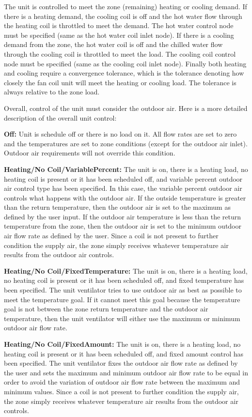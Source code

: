 The unit is controlled to meet the zone (remaining) heating or cooling demand. If there is a heating demand, the cooling coil is off and the hot water flow through the heating coil is throttled to meet the demand. The hot water control node must be specified (same as the hot water coil inlet node). If there is a cooling demand from the zone, the hot water coil is off and the chilled water flow through the cooling coil is throttled to meet the load. The cooling coil control node must be specified (same as the cooling coil inlet node). Finally both heating and cooling require a convergence tolerance, which is the tolerance denoting how closely the fan coil unit will meet the heating or cooling load. The tolerance is always relative to the zone load.

Overall, control of the unit must consider the outdoor air. Here is a more detailed description of the overall unit control:

\textbf{Off:} Unit is schedule off or there is no load on it. All flow rates are set to zero and the temperatures are set to zone conditions (except for the outdoor air inlet). Outdoor air requirements will not override this condition.

\textbf{Heating/No Coil/VariablePercent:} The unit is on, there is a heating load, no heating coil is present or it has been scheduled off, and variable percent outdoor air control type has been specified. In this case, the variable percent outdoor air controls what happens with the outdoor air. If the outside temperature is greater than the return temperature, then the outdoor air is set to the maximum as defined by the user input. If the outdoor air temperature is less than the return temperature from the zone, then the outdoor air is set to the minimum outdoor air flow rate as defined by the user. Since a coil is not present to further condition the supply air, the zone simply receives whatever temperature air results from the outdoor air controls.

\textbf{Heating/No Coil/FixedTemperature:} The unit is on, there is a heating load, no heating coil is present or it has been scheduled off, and fixed temperature has been specified. The unit ventilator tries to use outdoor air as best as possible to meet the temperature goal. If it cannot meet this goal because the temperature goal is not between the zone return temperature and the outdoor air temperature, then the unit ventilator will either use the maximum or minimum outdoor air flow rate.

\textbf{Heating/No Coil/FixedAmount:} The unit is on, there is a heating load, no heating coil is present or it has been scheduled off, and fixed amount control has been specified. The unit ventilator fixes the outdoor air flow rate as defined by the user and sets the maximum and minimum outdoor air flow rate to be equal in order to avoid the variation of outdoor air flow rate between the maximum and minimum values. Since a coil is not present to further condition the supply air, the zone simply receives whatever temperature air results from the outdoor air controls.

